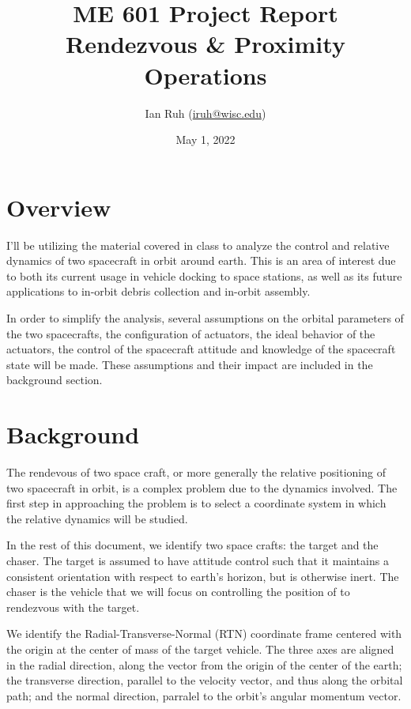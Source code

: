 \documentclass[12pt, letterpaper,titlepage]{article}
\title{ME 601 Project Report \\
\textbf{Rendezvous \& Proximity Operations}}
\author{Ian Ruh (\href{mailto:iruh@wisc.edu}{iruh@wisc.edu})}
\date{May 1, 2022}
\begin{document}
\maketitle


\section{Overview}

I'll be utilizing the material covered in class to analyze the control
and relative dynamics of two spacecraft in orbit around earth. This is an
area of interest due to both its current usage in vehicle docking to space
stations, as well as its future applications to in-orbit debris collection and
in-orbit assembly.

In order to simplify the analysis, several assumptions on the orbital
parameters of the two spacecrafts, the configuration of actuators, the ideal
behavior of the actuators, the control of the spacecraft attitude and knowledge
of the spacecraft state will be made. These assumptions and their impact are
included in the background section.

\section{Background}

The rendevous of two space craft, or more generally the relative positioning of
two spacecraft in orbit, is a complex problem due to the dynamics involved. The
first step in approaching the problem is to select a coordinate system in which
the relative dynamics will be studied.

In the rest of this document, we
identify two space crafts: the target and the chaser. The target is assumed to
have attitude control such that it maintains a consistent orientation with
respect to earth's horizon, but is otherwise inert. The chaser is the vehicle
that we will focus on controlling the position of to rendezvous
with the target.

We identify the Radial-Transverse-Normal (RTN) coordinate frame centered with
the origin at the center of mass of the target vehicle. The three axes are
aligned in the radial direction, along the vector from the origin of the center
of the earth; the transverse direction, parallel to the velocity vector, and
thus along the orbital path; and the normal direction, parralel to the orbit's
angular momentum vector.
\end{document}
